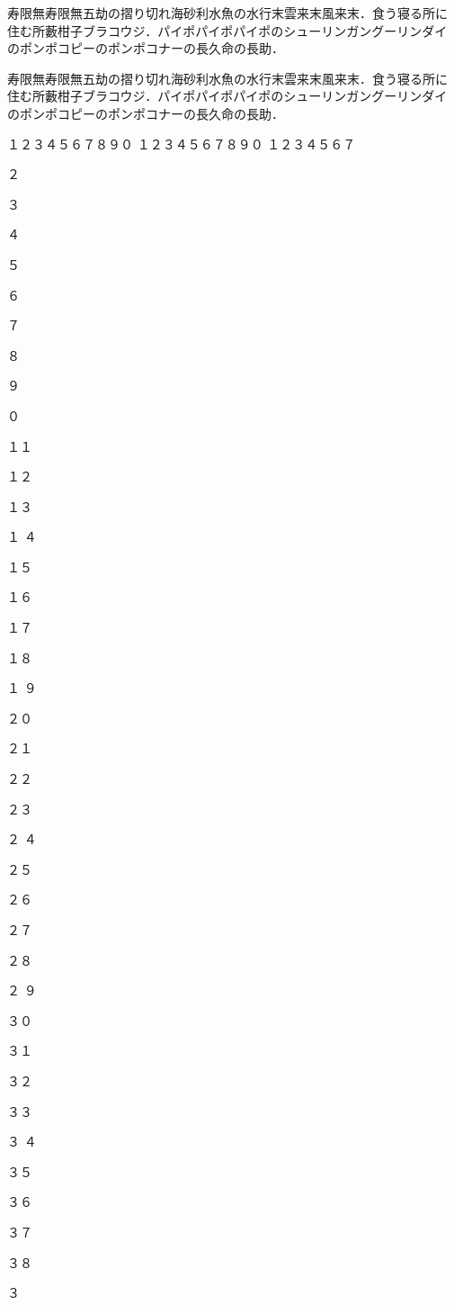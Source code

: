 \documentclass[a4j, 12Q, twocolumn, twoside]{jsarticle}
\begin{document}
寿限無寿限無五劫の摺り切れ海砂利水魚の水行末雲来末風来末．食う寝る所に
住む所藪柑子ブラコウジ．パイポパイポパイポのシューリンガングーリンダイ
のポンポコピーのポンポコナーの長久命の長助．

寿限無寿限無五劫の摺り切れ海砂利水魚の水行末雲来末風来末．食う寝る所に
住む所藪柑子ブラコウジ．パイポパイポパイポのシューリンガングーリンダイ
のポンポコピーのポンポコナーの長久命の長助．

\newpage
\noindent １２３４５６７８９０
１２３４５６７８９０
１２３４５６７%
\par \noindent ２\par \noindent ３\par \noindent ４\par \noindent ５\par
\noindent ６\par \noindent ７\par \noindent ８\par \noindent ９\par \noindent ０\par
\noindent １１\par \noindent １２\par \noindent １３\par \noindent １
４\par \noindent １５\par
\noindent １６\par \noindent １７\par \noindent １８\par \noindent １
９\par \noindent ２０\par
\noindent ２１\par \noindent ２２\par \noindent ２３\par \noindent ２
４\par \noindent ２５\par
\noindent ２６\par \noindent ２７\par \noindent ２８\par \noindent ２
９\par \noindent ３０\par
\noindent ３１\par \noindent ３２\par \noindent ３３\par \noindent ３
４\par \noindent ３５\par
\noindent ３６\par \noindent ３７\par \noindent ３８\par \noindent ３
\end{document}
